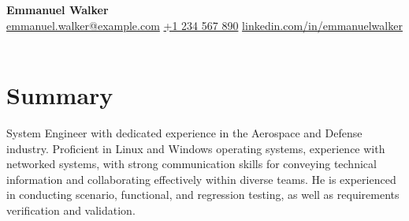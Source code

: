\documentclass[letter,10pt]{article}
\begin{document}
\begin{center}
    {\LARGE \textbf{Emmanuel Walker}} \\
    \vspace{2mm}
    \href{mailto:emmanuel.walker@example.com}{emmanuel.walker@example.com} \hfill
    \href{tel:+1234567890}{+1 234 567 890} \hfill
    \href{https://www.linkedin.com/in/emmanuelwalker}{linkedin.com/in/emmanuelwalker} \\
    \vspace{4mm}
       {}\\
   
\end{center}

\section*{Summary}
System Engineer with dedicated experience in the Aerospace and Defense industry. 
Proficient in Linux and Windows operating systems, experience with networked systems,
with strong communication skills for conveying technical information and collaborating 
effectively within diverse teams. He is experienced in conducting scenario, functional, 
and regression testing, as well as requirements verification and validation. 
\end{document}
